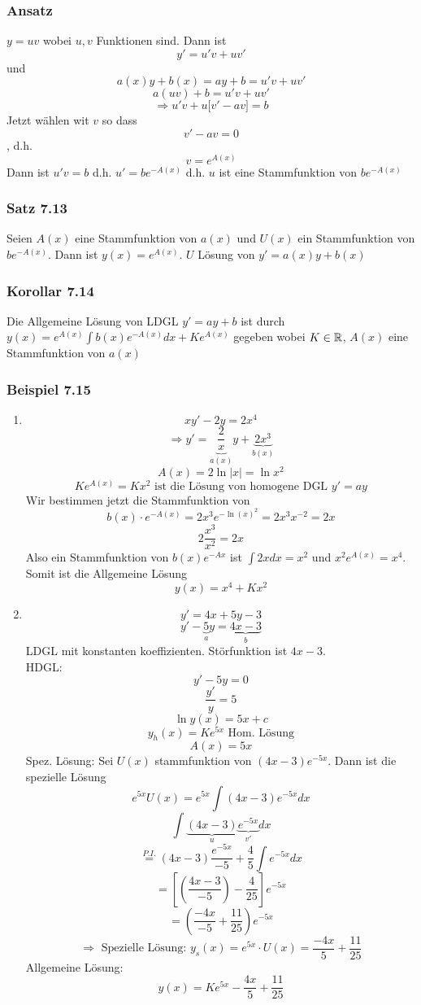 \subsubsection*{Ansatz}
$y=uv$ wobei $u,v$ Funktionen sind. Dann ist \[y'=u'v+uv'\] und \[a(x)y+b(x)=ay+b=u'v+uv'\]
\[a(uv)+b=u'v+uv'\]
\[\Rightarrow u'v+u\lbrack v'-av\rbrack =b\]
Jetzt wählen wit $v$ so dass \[v'-av=0\], d.h. \[v=e^{A(x)}\] Dann ist $u'v=b$ d.h. $u'=be^{-A(x)}$ d.h. $u$ ist eine Stammfunktion von $be^{-A(x)}$

\subsubsection*{Satz 7.13}
Seien $A(x)$ eine Stammfunktion von $a(x)$ und $U(x)$ ein Stammfunktion von $be^{-A(x)}$. Dann ist $y(x)=e^{A(x)}$. $U$ Lösung von $y'=a(x)y+b(x)$

\subsubsection*{Korollar 7.14}
Die Allgemeine Lösung von LDGL $y'=ay+b$ ist durch $y(x)=e^{A(x)}\int{b(x)e^{-A(x)} dx}+Ke^{A(x)}$ gegeben wobei $K\in\mathbb{R}$, $A(x)$ eine Stammfunktion von $a(x)$

\subsubsection*{Beispiel 7.15}
\begin{enumerate}
\item \[xy'-2y=2x^4\]
\[\Rightarrow y' = \underbrace {\frac{2}{x}}_{a(x)}y + \underbrace {2{x^3}}_{b(x)}\]
\[A(x)=2\ln\left| x \right|=\ln x^2\]
\[Ke^{A(x)}=Kx^2\text{ ist die Lösung von homogene DGL }y'=ay\]
Wir bestimmen jetzt die Stammfunktion von \[b(x)\cdot e^{-A(x)}=2x^3e^{-\ln (x)^2}=2x^3 x^{-2}=2x\]
\[2\frac{x^3}{x^2}=2x\]
Also ein Stammfunktion von $b(x)e^{-Ax}$ ist  $\int{2xdx=x^2}$ und $x^2e^{A(x)}=x^4$. Somit ist die Allgemeine Lösung \[y(x)=x^4+Kx^2\]
\item \[y'=4x+5y-3\]
\[y' - \underbrace 5_ay = \underbrace {4x - 3}_b\]
LDGL mit konstanten koeffizienten. Störfunktion ist  $4x-3$.\\

\noindent HDGL: \[y'-5y=0\]
\[\frac{y'}{y}=5\]
\[\ln y(x)=5x+c\]
\[y_h(x)=Ke^{5x} \text{ Hom. Lösung}\]
\[A(x)=5x\]
Spez. Lösung: Sei $U(x)$ stammfunktion von $(4x-3)e^{-5x}$. Dann ist die spezielle Lösung \[e^{5x}U(x)=e^{5x}\int{(4x-3)e^{-5x}dx}\]
\[ \int {\underbrace {(4x - 3)}_u\underbrace {{e^{ - 5x}}}_{v'}dx} \]
\[\mathop = \limits^{P.I.} (4x - 3)\frac{{{e^{ - 5x}}}}{{ - 5}} + \frac{4}{5}\int {{e^{ - 5x}}dx}\]
\[ = \left[ {\left( {\frac{{4x - 3}}{{ - 5}}} \right) - \frac{4}{{25}}} \right]{e^{ - 5x}}\]
\[ = \left( {\frac{{ - 4x}}{{ - 5}} + \frac{{11}}{{25}}} \right){e^{ - 5x}}\]
\[\Rightarrow \text{ Spezielle Lösung: }y_s(x)=e^{5x}\cdot U(x)=\frac{-4x}{5}+\frac{11}{25}\]
Allgemeine Lösung: \[y(x)=Ke^{5x}-\frac{4x}{5}+\frac{11}{25}\]
\end{enumerate}

